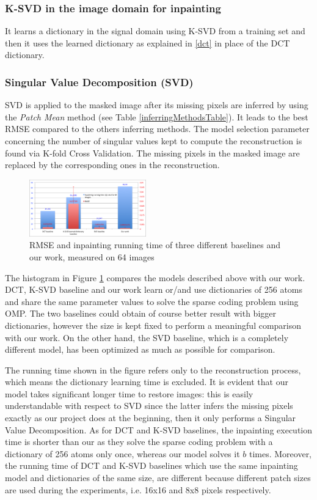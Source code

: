 \documentclass[conference]{IEEEtran}
\begin{document}
\subsubsection{K-SVD in the image domain for inpainting}
It learns a dictionary in the signal domain using K-SVD \cite{ksvd} from a training set and then it uses the learned dictionary as explained in \ref{dct} in place of the DCT dictionary.
\subsubsection{Singular Value Decomposition (SVD)}
SVD is applied to the masked image after its missing pixels are inferred by using the \textit{Patch Mean} method (see Table \ref{inferringMethodsTable}). It leads to the best RMSE compared to the others inferring methods. The model selection parameter concerning the number of singular values kept to compute the reconstruction is found via K-fold Cross Validation. The missing pixels in the masked image are replaced by the corresponding ones in the reconstruction.

 \begin{figure}[h]
\centering
\includegraphics[width=0.45\textwidth]{baselines_comparison}
\caption{RMSE and inpainting running time of three different baselines and our work, measured on 64 images}
\label{baselines_graph}
\end{figure}
 

 The histogram in Figure \ref{baselines_graph} compares the models described above with our work. DCT, K-SVD baseline and our work learn or/and use dictionaries of 256 atoms and share the same parameter values to solve the sparse coding problem using OMP. The two baselines could obtain of course better result with bigger dictionaries, however the size is kept fixed to perform a meaningful comparison with our work. On the other hand, the SVD baseline, which is a completely different model, has been optimized as much as possible for comparison. 

  The running time shown in the figure refers only to the reconstruction process, which means the dictionary learning time is excluded. It is evident that our model takes significant longer time to restore images: this is easily understandable with respect to SVD since the latter infers the missing pixels exactly as our project does at the beginning, then it only performs a Singular Value Decomposition. As for DCT and K-SVD baselines, the inpainting execution time is shorter than our as they solve the sparse coding problem with a dictionary of 256 atoms only once, whereas our model solves it $b$ times. Moreover, the running time of DCT and K-SVD baselines which use the same inpainting model and dictionaries of the same size, are different because different patch sizes are used during the experiments, i.e. 16x16 and 8x8 pixels respectively.  
  
\end{document}
